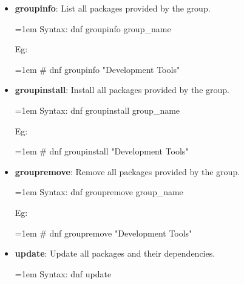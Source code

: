 \begin{flushleft}
\begin{itemize}
		\item \textbf{groupinfo}: List all packages provided by the group.
		\begin{tcolorbox}[breakable,notitle,boxrule=-0pt,colback=pink,colframe=pink]
			\color{black}
			\font=1em
			Syntax: dnf groupinfo group\_name 
			\font=4pt
		\end{tcolorbox}
		Eg:
		\begin{tcolorbox}[breakable,notitle,boxrule=-0pt,colback=black,colframe=black]
			\color{green}
			\font=1em
			\# dnf groupinfo "Development Tools"
			\font=4pt
		\end{tcolorbox}
		\bigskip
		\bigskip	
		
		\item \textbf{groupinstall}: Install all packages provided by the group.
		\begin{tcolorbox}[breakable,notitle,boxrule=-0pt,colback=pink,colframe=pink]
			\color{black}
			\font=1em
			Syntax: dnf groupinstall group\_name 
			\font=4pt
		\end{tcolorbox}
		Eg:
		\begin{tcolorbox}[breakable,notitle,boxrule=-0pt,colback=black,colframe=black]
			\color{green}
			\font=1em
			\# dnf groupinstall "Development Tools"
			\font=4pt
		\end{tcolorbox}
		\bigskip
		\bigskip	
		
		\item \textbf{groupremove}: Remove all packages provided by the group.
		\begin{tcolorbox}[breakable,notitle,boxrule=-0pt,colback=pink,colframe=pink]
			\color{black}
			\font=1em
			Syntax: dnf groupremove group\_name 
			\font=4pt
		\end{tcolorbox}
		Eg:
		\begin{tcolorbox}[breakable,notitle,boxrule=-0pt,colback=black,colframe=black]
			\color{green}
			\font=1em
			\# dnf groupremove "Development Tools"
			\font=4pt
		\end{tcolorbox}
		\bigskip
		\bigskip	



		\item \textbf{update}: Update all packages and their dependencies.
		\begin{tcolorbox}[breakable,notitle,boxrule=-0pt,colback=pink,colframe=pink]
			\color{black}
			\font=1em
			Syntax: dnf update
			\font=4pt
		\end{tcolorbox}
		\bigskip
		\bigskip	


\end{itemize}
\end{flushleft}

